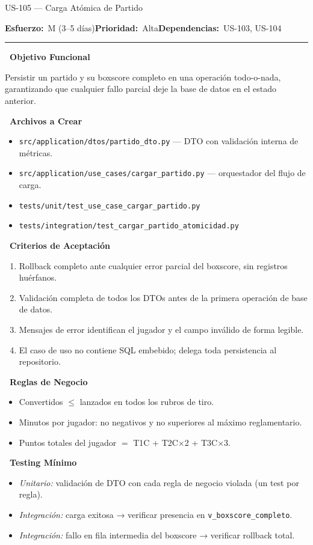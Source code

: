 \documentclass[11pt,a4paper]{article}
\newcommand{\fpath}[1]{\texttt{\small #1}}
\newcommand{\usfield}[2][\;]{%
  \par\vspace{5pt}%
  {\small\textbf{\textcolor{primary}{#2}}}\par\vspace{2pt}%
}
\newcommand{\usmeta}[3]{%
  \vspace{2pt}%
  {\small\textcolor{secondary}{%
    \textbf{Esfuerzo:}~#1\quad\textbf{Prioridad:}~#2\quad\textbf{Dependencias:}~#3%
  }}%
  \par\vspace{4pt}%
  \textcolor{bordergray}{\rule{\linewidth}{0.4pt}}\par\vspace{4pt}%
}
\begin{document}
\begin{uscard}{US-105 — Carga Atómica de Partido}

\usmeta{M (3–5 días)}{Alta}{US-103, US-104}

\usfield{\faAlignLeft\ Objetivo Funcional}
Persistir un partido y su boxscore completo en una operación todo-o-nada, garantizando que cualquier fallo parcial deje la base de datos en el estado anterior.

\usfield{\faFolderOpen\ Archivos a Crear}
\begin{itemize}[nosep, leftmargin=1.6em]
  \item \fpath{src/application/dtos/partido\_dto.py} — DTO con validación interna de métricas.
  \item \fpath{src/application/use\_cases/cargar\_partido.py} — orquestador del flujo de carga.
  \item \fpath{tests/unit/test\_use\_case\_cargar\_partido.py}
  \item \fpath{tests/integration/test\_cargar\_partido\_atomicidad.py}
\end{itemize}

\usfield{\faCheckCircle\ Criterios de Aceptación}
\begin{enumerate}[label=\textcolor{accent}{\textbf{AC\arabic*.}}, nosep, leftmargin=2.2em]
  \item Rollback completo ante cualquier error parcial del boxscore, sin registros huérfanos.
  \item Validación completa de todos los DTOs antes de la primera operación de base de datos.
  \item Mensajes de error identifican el jugador y el campo inválido de forma legible.
  \item El caso de uso no contiene SQL embebido; delega toda persistencia al repositorio.
\end{enumerate}

\usfield{\faExclamationCircle\ Reglas de Negocio}
\begin{itemize}[nosep, leftmargin=1.6em]
  \item Convertidos $\leq$ lanzados en todos los rubros de tiro.
  \item Minutos por jugador: no negativos y no superiores al máximo reglamentario.
  \item Puntos totales del jugador $=$ T1C + T2C$\times$2 + T3C$\times$3.
\end{itemize}

\usfield{\faFlask\ Testing Mínimo}
\begin{itemize}[nosep, leftmargin=1.6em]
  \item \textit{Unitario:} validación de DTO con cada regla de negocio violada (un test por regla).
  \item \textit{Integración:} carga exitosa → verificar presencia en \fpath{v\_boxscore\_completo}.
  \item \textit{Integración:} fallo en fila intermedia del boxscore → verificar rollback total.
\end{itemize}

\end{uscard}
\end{document}
